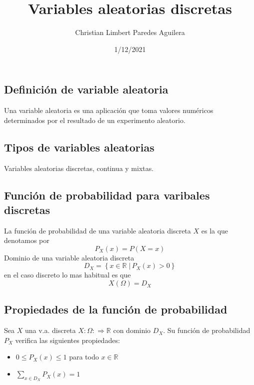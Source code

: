 \documentclass[
]{article}
\title{Variables aleatorias discretas}
\author{Christian Limbert Paredes Aguilera}
\date{1/12/2021}
\begin{document}
\maketitle

\hypertarget{definiciuxf3n-de-variable-aleatoria}{%
\subsection{Definición de variable
aleatoria}\label{definiciuxf3n-de-variable-aleatoria}}

Una variable aleatoria es una aplicación que toma valores numéricos
determinados por el resultado de un experimento aleatorio.

\hypertarget{tipos-de-variables-aleatorias}{%
\subsection{Tipos de variables
aleatorias}\label{tipos-de-variables-aleatorias}}

Variables aleatorias discretas, continua y mixtas.

\hypertarget{funciuxf3n-de-probabilidad-para-varibales-discretas}{%
\subsection{Función de probabilidad para varibales
discretas}\label{funciuxf3n-de-probabilidad-para-varibales-discretas}}

La función de probabilidad de una variable aleatoria discreta \(X\) es
la que denotamos por \[P_X(x) = P(X=x)\] Dominio de una variable
aleatoria discreta
\[D_X = \left\{ x \in \mathbb{R} \; | \, P_X(x) > 0\right\}\] en el caso
discreto lo mas habitual es que \[X(\Omega) =D_X\]

\hypertarget{propiedades-de-la-funciuxf3n-de-probabilidad}{%
\subsection{Propiedades de la función de
probabilidad}\label{propiedades-de-la-funciuxf3n-de-probabilidad}}

Sea \(X\) una v.a. discreta \(X:\Omega:\Rightarrow \mathbb{R}\) con
dominio \(D_X\). Su función de probabilidad \(P_X\) verifica las
siguientes propiedades:

\begin{itemize}
\item
  \(0\leq P_X(x) \leq 1\) para todo \(x\in \mathbb{R}\)
\item
  \(\sum\limits_{x\in D_X} P_X(x) = 1\)
\end{itemize}
\end{document}
